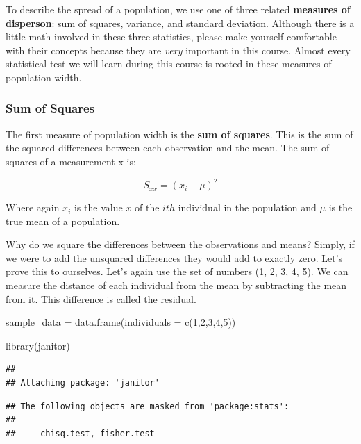 \documentclass[
]{book}
\newenvironment{Shaded}{\begin{snugshade}}{\end{snugshade}}
\newcommand{\AttributeTok}[1]{\textcolor[rgb]{0.77,0.63,0.00}{#1}}
\newcommand{\DecValTok}[1]{\textcolor[rgb]{0.00,0.00,0.81}{#1}}
\newcommand{\FunctionTok}[1]{\textcolor[rgb]{0.00,0.00,0.00}{#1}}
\newcommand{\NormalTok}[1]{#1}
\newcommand{\OtherTok}[1]{\textcolor[rgb]{0.56,0.35,0.01}{#1}}
\begin{document}
To describe the spread of a population, we use one of three related
\textbf{measures of disperson}: sum of squares, variance, and standard
deviation. Although there is a little math involved in these three
statistics, please make yourself comfortable with their concepts because
they are \emph{very} important in this course. Almost every statistical test
we will learn during this course is rooted in these measures of
population width.

\hypertarget{sum-of-squares}{%
\subsubsection{Sum of Squares}\label{sum-of-squares}}

The first measure of population width is the \textbf{sum of squares}. This is
the sum of the squared differences between each observation and the
mean. The sum of squares of a measurement x is:

\[\displaystyle S_{xx} = (x_i - \mu)^2\]

Where again \(x_i\) is the value \(x\) of the \(ith\) individual in the
population and \(\mu\) is the true mean of a population.

Why do we square the differences between the observations and means?
Simply, if we were to add the unsquared differences they would add to
exactly zero. Let's prove this to ourselves. Let's again use the set of
numbers (1, 2, 3, 4, 5). We can measure the distance of each individual
from the mean by subtracting the mean from it. This difference is called
the residual.

\begin{Shaded}
\begin{Highlighting}[]
\NormalTok{sample\_data }\OtherTok{=} \FunctionTok{data.frame}\NormalTok{(}\AttributeTok{individuals =} \FunctionTok{c}\NormalTok{(}\DecValTok{1}\NormalTok{,}\DecValTok{2}\NormalTok{,}\DecValTok{3}\NormalTok{,}\DecValTok{4}\NormalTok{,}\DecValTok{5}\NormalTok{))}

\FunctionTok{library}\NormalTok{(janitor)}
\end{Highlighting}
\end{Shaded}

\begin{verbatim}
## 
## Attaching package: 'janitor'
\end{verbatim}

\begin{verbatim}
## The following objects are masked from 'package:stats':
## 
##     chisq.test, fisher.test
\end{verbatim}
\end{document}
